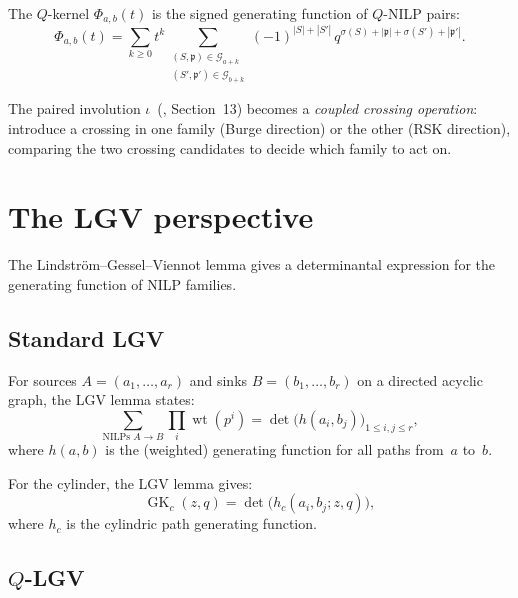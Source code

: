\documentclass[11pt]{article}
\newcommand{\GK}{\operatorname{GK}}
\DeclareMathOperator{\wt}{wt}
\theoremstyle{plain}
\theoremstyle{definition}
\begin{document}
The $Q$-kernel $\Phi_{a,b}(t)$ is the signed generating
function of $Q$-NILP pairs:
\begin{equation}\label{eq:Phi-NILP-pairs}
  \Phi_{a,b}(t) = \sum_{k \geq 0} t^k
    \sum_{\substack{(S, \mathfrak{p}) \in
      \mathcal{G}_{a+k} \\
      (S', \mathfrak{p}') \in \mathcal{G}_{b+k}}}
    (-1)^{|S|+|S'|}\,
    q^{\sigma(S)+|\mathfrak{p}|+\sigma(S')+|\mathfrak{p}'|}.
\end{equation}

The paired involution $\iota$~(\cite{LOCAL_RULE},
Section~13) becomes a \emph{coupled crossing operation}:
introduce a crossing in one family (Burge direction) or
the other (RSK direction), comparing the two crossing
candidates to decide which family to act on.


\section{The LGV perspective}
\label{sec:LGV}

The Lindstr\"om--Gessel--Viennot lemma gives a
determinantal expression for the generating function
of NILP families.

\subsection{Standard LGV}

For sources $A = (a_1, \ldots, a_r)$ and sinks
$B = (b_1, \ldots, b_r)$ on a directed acyclic graph, the
LGV lemma states:
\begin{equation}\label{eq:LGV}
  \sum_{\text{NILPs } A \to B}
    \prod_i \wt(p^i)
  = \det\bigl(h(a_i, b_j)\bigr)_{1 \leq i,j \leq r},
\end{equation}
where $h(a, b)$ is the (weighted) generating function for
all paths from~$a$ to~$b$.

For the cylinder, the LGV lemma gives:
\begin{equation}\label{eq:LGV-cylinder}
  \GK_c(z,q) = \det\bigl(h_c(a_i, b_j; z, q)\bigr),
\end{equation}
where $h_c$ is the cylindric path generating function.


\subsection{$Q$-LGV}
\end{document}
